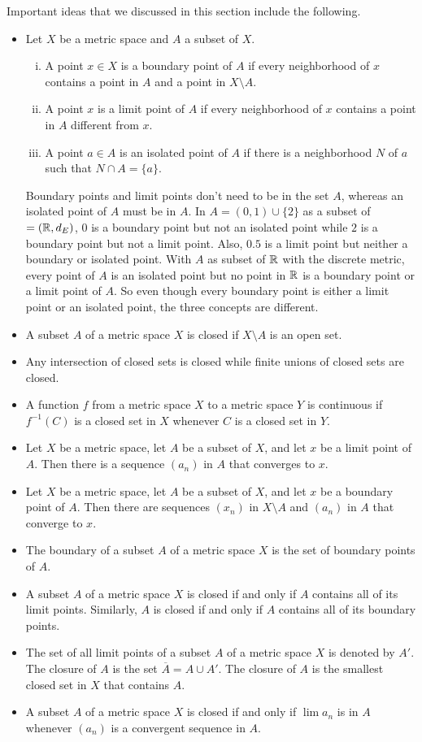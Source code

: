 Important ideas that we discussed in this section include the following.
\begin{itemize}
\item Let $X$ be a metric space and $A$ a subset of $X$. 
	\begin{enumerate}[i.]
	\item A point $x \in X$ is a boundary point of $A$ if every neighborhood of $x$ contains a point in $A$ and a point in $X \setminus A$. 
	\item A point $x$ is a limit point of $A$ if every neighborhood of $x$ contains a point in $A$ different from $x$.
	\item A point $a \in A$ is an isolated point of $A$ if there is a neighborhood $N$ of $a$ such that $N \cap A = \{a\}$. 
	\end{enumerate}
	Boundary points and limit points don't need to be in the set $A$, whereas an isolated point of $A$ must be in $A$. In $A = (0,1) \cup \{2\}$ as a subset of $=(\mathbb{R}, d_E)$, $0$ is a boundary point but not an isolated point while $2$ is a boundary point but not a limit point. Also, $0.5$ is a limit point but neither a boundary or isolated point. With $A$ as subset of $\mathbb{R}$ with the discrete metric, every point of $A$ is an isolated point but no point in $\mathbb{R}$ is a boundary point or a limit point of $A$. So even though every boundary point is either a limit point or an isolated point, the three concepts are different.
\item A subset $A$ of a metric space $X$ is closed if $X \setminus A$ is an open set. 
\item Any intersection of closed sets is closed while finite unions of closed sets are closed. 
\item A function $f$ from a metric space $X$ to a metric space $Y$ is continuous if $f^{-1}(C)$ is a closed set in $X$ whenever $C$ is a closed set in $Y$. 
\item Let $X$ be a metric space, let $A$ be a subset of $X$, and let $x$ be a limit point of $A$. Then there is a sequence $(a_n)$ in $A$ that converges to $x$.
\item Let $X$ be a metric space, let $A$ be a subset of $X$, and let $x$ be a boundary point of $A$. Then there are sequences $(x_n)$ in $X \setminus A$ and $(a_n)$ in $A$ that converge to $x$.
\item The boundary of a subset $A$ of a metric space $X$ is the set of boundary points of $A$. 
\item A subset $A$ of a metric space $X$ is closed if and only if $A$ contains all of its limit points. Similarly, $A$ is closed if and only if $A$ contains all of its boundary points.  
\item The set of all limit points of a subset $A$ of a metric space $X$ is denoted by $A'$. The closure of $A$ is the set $\overline{A} = A \cup A'$. The closure of $A$ is the smallest closed set in $X$ that contains $A$. 
\item A subset $A$ of a metric space $X$ is closed if and only if $\lim a_n$ is in $A$ whenever $(a_n)$ is a convergent sequence in $A$. 
\end{itemize}

